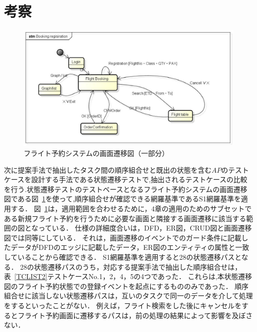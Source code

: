\documentclass[a4paper,11pt]{jreport}
\begin{document}
\section{考察}

\begin{figure}[h]
\begin{center}
\includegraphics[scale=0.3]{screentransition.eps}
\end{center}
\caption{フライト予約システムの画面遷移図（一部分）}
\label{fig:STD}
\end{figure}

次に提案手法で抽出したタスク間の順序組合せと既出の状態を含む$AP$のテストケースを設計する手法である状態遷移テストで,抽出されるテストケースの比較を行う.状態遷移テストのテストベースとなるフライト予約システムの画面遷移図である図~\ref{fig:STD}を使って,順序組合せが確認できる網羅基準であるS1網羅基準を適用する．
図~\ref{fig:STD}は，適用範囲を合わせるために，4章の適用のためのサブセットである新規フライト予約を行うために必要な画面と隣接する画面遷移に該当する範囲の図となっている．
仕様の詳細度合いは，DFD，ER図，CRUD図と画面遷移図では同等にしている．
それは，画面遷移のイベントでのガード条件に記載したデータがDFDのエッジに記載したデータ，ER図のエンティティの属性と一致していることから確認できる．
S1網羅基準を適用すると28の状態遷移パスとなる．
28の状態遷移パスのうち，対応する提案手法で抽出した順序組合せは，表~\ref{TCLIST2}テストケースNo.1，2，4，5の4つであった．
これらは,本状態遷移図のフライト予約状態での登録イベントを起点にするもののみであった．
順序組合せに該当しない状態遷移パスは，互いのタスクで同一のデータを介して処理をするといったことがない．
例えば，フライト検索をした後にキャンセルをするとフライト予約画面に遷移するパスは，前の処理の結果によって影響を及ぼさない．
\end{document}
